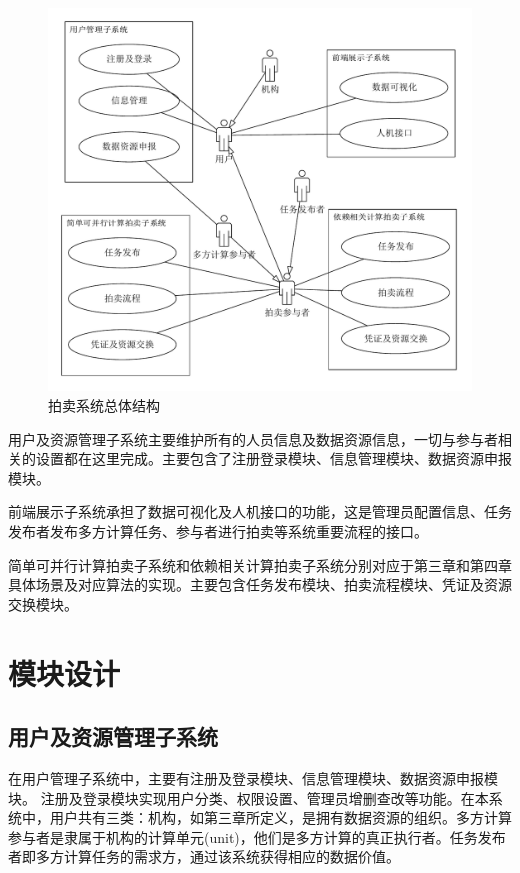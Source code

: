 \documentclass[promaster]{thesis-uestc}
\begin{document}
\begin{figure}[h]
    \includegraphics[width=350pt]{pic/yongli.pdf}
    \caption{拍卖系统总体结构}
\end{figure}

用户及资源管理子系统主要维护所有的人员信息及数据资源信息，一切与参与者相关的设置都在这里完成。主要包含了注册登录模块、信息管理模块、数据资源申报模块。

前端展示子系统承担了数据可视化及人机接口的功能，这是管理员配置信息、任务发布者发布多方计算任务、参与者进行拍卖等系统重要流程的接口。

简单可并行计算拍卖子系统和依赖相关计算拍卖子系统分别对应于第三章和第四章具体场景及对应算法的实现。主要包含任务发布模块、拍卖流程模块、凭证及资源交换模块。

\section{模块设计}
\subsection{用户及资源管理子系统}
在用户管理子系统中，主要有注册及登录模块、信息管理模块、数据资源申报模块。
注册及登录模块实现用户分类、权限设置、管理员增删查改等功能。在本系统中，用户共有三类：机构，如第三章所定义，是拥有数据资源的组织。多方计算参与者是隶属于机构的计算单元(unit)，他们是多方计算的真正执行者。任务发布者即多方计算任务的需求方，通过该系统获得相应的数据价值。
\end{document}

